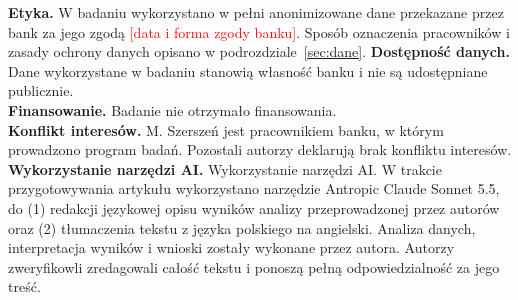 \documentclass[11pt]{article}
\newcommand{\fillin}[1]{\textcolor{red}{[#1]}}
\begin{document}
\noindent\textbf{Etyka.}
W badaniu wykorzystano w pełni anonimizowane dane przekazane przez bank za jego zgodą
\fillin{data i forma zgody banku}. Sposób oznaczenia pracowników i zasady ochrony danych opisano
w podrozdziale~\ref{sec:dane}.
\textbf{Dostępność danych.}
Dane wykorzystane w badaniu stanowią własność banku i nie są
udostępniane publicznie.\\
\textbf{Finansowanie.}
Badanie nie otrzymało finansowania.\\
\textbf{Konflikt interesów.}
M. Szerszeń jest pracownikiem banku, w którym prowadzono program badań. Pozostali autorzy deklarują
brak konfliktu interesów.\\
\textbf{Wykorzystanie narzędzi AI.}
Wykorzystanie narzędzi AI. W trakcie przygotowywania artykułu wykorzystano narzędzie Antropic Claude Sonnet 5.5, do (1) redakcji językowej opisu wyników analizy przeprowadzonej przez autorów oraz (2) tłumaczenia tekstu z języka polskiego na angielski. Analiza danych, interpretacja wyników i wnioski zostały wykonane przez autora. Autorzy zweryfikowli zredagowali całość tekstu i ponoszą pełną odpowiedzialność za jego treść.


\end{document}
